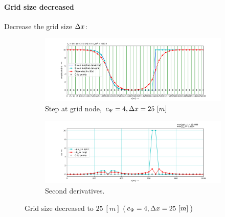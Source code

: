 \paragraph*{Grid size decreased}
Decrease the grid size $\Delta x$:
\begin{figure}[H]
    \centering
    \begin{subfigure}[t]{0.49\textwidth}
        \includegraphics[width=1.0\textwidth]{figures/regul_1_1d_scalar_dx25.0_cpsi4.0.pdf}
        \caption{Step at grid node, $c_\Psi = 4, \Dx = 25\ [m]$}
    \end{subfigure}
    \hfill
    \begin{subfigure}[t]{0.49\textwidth}
        \centering
        \includegraphics[width=1.0\textwidth]{figures/regul_2_1d_scalar_dx25.0_cpsi4.0.pdf}
        \caption{Second derivatives.}
    \end{subfigure}
    \caption{Grid size decreased to $25\ [m]$ ($c_\Psi = 4, \Dx = 25\ [m]$)}
\end{figure}
